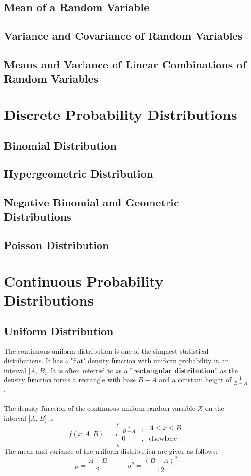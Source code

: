 \documentclass[11pt]{article}
\begin{document}
\subsection{Mean of a Random Variable}
\subsection{Variance and Covariance of Random Variables}
\subsection{Means and Variance of Linear Combinations of Random Variables}

\pagebreak
\section{Discrete Probability Distributions}
\subsection{Binomial Distribution}
\subsection{Hypergeometric Distribution}
\subsection{Negative Binomial and Geometric Distributions}
\subsection{Poisson Distribution}

\pagebreak

\section{Continuous Probability Distributions}
\subsection{Uniform Distribution}
The continuous uniform distribution is one of the simplest statistical distributions. It has a "flat" density function with uniform probability in an interval [$A$, $B$]. It is  often referred to as a \textbf{"rectangular distribution"} as the density function forms a rectangle with base $B-A$ and a constant height of $\frac{1}{B-A}$. \\ \\
The density function of the continuous uniform random variable $X$ on the interval [$A$, $B$] is
$$ f(x; A, B) =   \left\{
\begin{array}{lll}
      \frac{1}{B-A} & \text{,} & A\leq x\leq B \\
      0 & \text{,} & \text{elsewhere} \\
\end{array} 
\right. $$
The mean and variance of the uniform distribution are given as follows:
$$ \mu = \frac{A+B}{2} \quad \quad \quad \sigma^2 = \frac{(B-A)^2}{12}$$
\end{document}
